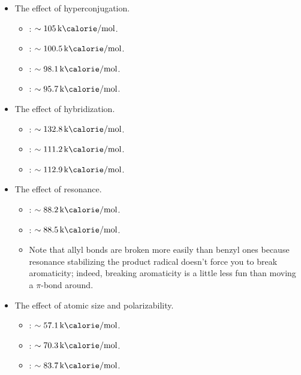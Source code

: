 \documentclass[../notes.tex]{subfiles}
\begin{document}
\begin{itemize}
\begin{itemize}
        \item The effect of hyperconjugation.
        \begin{itemize}
            \item {}: $\sim\SI[per-mode=symbol]{105}{\kilo\calorie\per\mole}$.
            \item {}: $\sim\SI[per-mode=symbol]{100.5}{\kilo\calorie\per\mole}$.
            \item {}: $\sim\SI[per-mode=symbol]{98.1}{\kilo\calorie\per\mole}$.
            \item {}: $\sim\SI[per-mode=symbol]{95.7}{\kilo\calorie\per\mole}$.
        \end{itemize}
        \item The effect of hybridization.
        \begin{itemize}
            \item {}: $\sim\SI[per-mode=symbol]{132.8}{\kilo\calorie\per\mole}$.
            \item {}: $\sim\SI[per-mode=symbol]{111.2}{\kilo\calorie\per\mole}$.
            \item {}: $\sim\SI[per-mode=symbol]{112.9}{\kilo\calorie\per\mole}$.
        \end{itemize}
        \item The effect of resonance.
        \begin{itemize}
            \item {}: $\sim\SI[per-mode=symbol]{88.2}{\kilo\calorie\per\mole}$.
            \item {}: $\sim\SI[per-mode=symbol]{88.5}{\kilo\calorie\per\mole}$.
            \item Note that allyl bonds are broken more easily than benzyl ones because resonance stabilizing the product radical doesn't force you to break aromaticity; indeed, breaking aromaticity is a little less fun than moving a $\pi$-bond around.
        \end{itemize}
        \item The effect of atomic size and polarizability.
        \begin{itemize}
            \item {}: $\sim\SI[per-mode=symbol]{57.1}{\kilo\calorie\per\mole}$.
            \item {}: $\sim\SI[per-mode=symbol]{70.3}{\kilo\calorie\per\mole}$.
            \item {}: $\sim\SI[per-mode=symbol]{83.7}{\kilo\calorie\per\mole}$.

\end{itemize}
\end{itemize}
\end{itemize}
\end{document}
